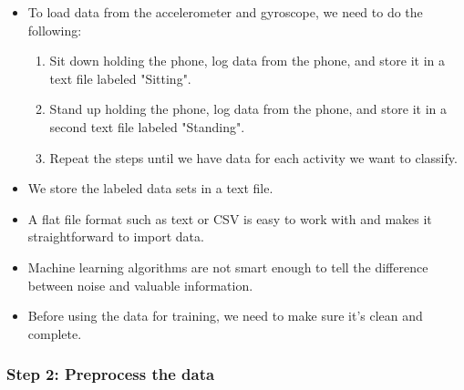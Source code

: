 \documentclass[a4paper]{article}
\begin{document}
			\begin{itemize}
				\item To load data from the accelerometer and gyroscope, we need to do the following:
					\begin{enumerate}
						\item Sit down holding the phone, log data from the phone, and store it in a text file labeled "Sitting".
						\item Stand up holding the phone, log data from the phone, and store it in a second text file labeled "Standing".
						\item Repeat the steps until we have data for each activity we want to classify.
					\end{enumerate}
				\item We store the labeled data sets in a text file.
				\item A flat file format such as text or CSV is easy to work with and makes it straightforward to import data.
				\item Machine learning algorithms are not smart enough to tell the difference between noise and valuable information.
				\item Before using the data for training, we need to make sure it's clean and complete.
			\end{itemize}
		
			\subsubsection{Step 2: Preprocess the data}
			
\end{document}
